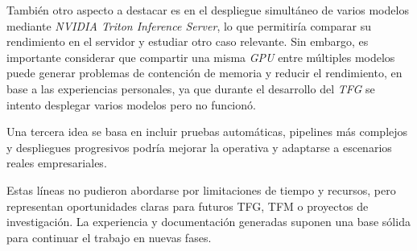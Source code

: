 También otro aspecto a destacar es en el despliegue simultáneo de varios modelos mediante \textit{NVIDIA Triton Inference Server}, lo que permitiría comparar su rendimiento en el servidor y estudiar otro caso relevante. Sin embargo, es importante considerar que compartir una misma \textit{GPU} entre múltiples modelos puede generar problemas de contención de memoria y reducir el rendimiento, en base a las experiencias personales, ya que durante el desarrollo del \textit{TFG} se intento desplegar varios modelos pero no funcionó.

Una tercera idea se basa en incluir pruebas automáticas, pipelines más complejos y despliegues progresivos podría mejorar la operativa y adaptarse a escenarios reales empresariales.

Estas líneas no pudieron abordarse por limitaciones de tiempo y recursos, pero representan oportunidades claras para futuros TFG, TFM o proyectos de investigación. La experiencia y documentación generadas suponen una base sólida para continuar el trabajo en nuevas fases.
